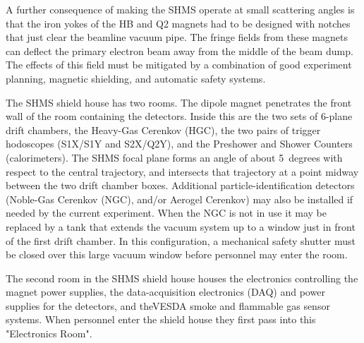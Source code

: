 {A further consequence of making the SHMS operate at small scattering angles is
that the iron yokes of the HB and Q2 magnets had to be designed with notches
that just clear the beamline vacuum pipe. The fringe fields from these magnets can
deflect the primary electron beam away from the middle of the beam dump.
The effects of this field
must be mitigated by a combination of good experiment planning, magnetic shielding,
and automatic safety systems.

The SHMS shield house has two rooms. The dipole magnet penetrates the front
wall of the room containing the detectors. Inside this are the two sets of 6-plane
drift chambers, the Heavy-Gas Cerenkov (HGC), the two pairs of trigger hodoscopes
(S1X/S1Y and S2X/Q2Y), and
the Preshower and Shower Counters (calorimeters). The SHMS focal plane forms an
angle of about 5~degrees with respect to the central trajectory,
and intersects that trajectory at
a point midway between the two drift chamber boxes. Additional  particle-identification
detectors (Noble-Gas Cerenkov (NGC), and/or Aerogel Cerenkov) may also be
installed if needed by the current experiment. When the NGC is not in use it may
be replaced by a tank that extends the vacuum system up  to a window just in
front of the first drift chamber. In this configuration, a mechanical safety shutter
must be closed over this large vacuum window before personnel may enter the
room.

The second room in the SHMS shield house houses the
electronics controlling the magnet power supplies, the data-acquisition
electronics (DAQ) and power supplies for the detectors, and theVESDA
smoke and flammable gas sensor systems. When personnel enter the shield
house they first pass into this "Electronics Room".
}


